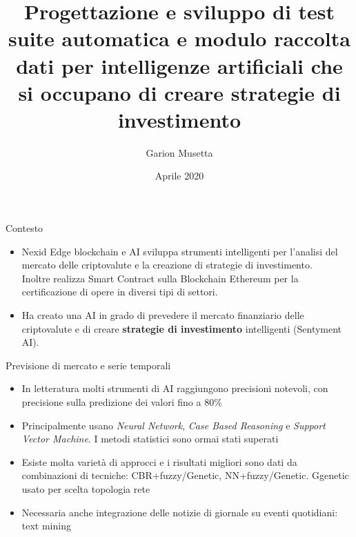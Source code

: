 \documentclass{beamer}
\title[Trading AI]{Progettazione e sviluppo di test suite automatica e modulo raccolta dati per intelligenze artificiali che si occupano di creare strategie di investimento}
\author{Garion Musetta}
\date{Aprile 2020}
\begin{document}
\maketitle

\begin{frame}{Contesto}
\begin{itemize}
\item Nexid Edge blockchain e AI sviluppa strumenti intelligenti per l’analisi del mercato delle criptovalute e
la creazione di strategie di investimento.\\ Inoltre realizza Smart Contract sulla Blockchain Ethereum per la certificazione di opere in diversi tipi di settori.
\item Ha creato una AI in grado di prevedere il mercato finanziario delle criptovalute e di creare \textbf{strategie di investimento} intelligenti (Sentyment AI).
\end{itemize}
\begin{figure}
\end{figure}
\end{frame}

\begin{frame}{Previsione di mercato e serie temporali}
\begin{itemize}
\item In letteratura molti strumenti di AI raggiungono precisioni notevoli, con precisione sulla predizione dei valori fino a 80\%
\item Principalmente usano \textit{Neural Network}, \textit{Case Based Reasoning} e \textit{Support Vector Machine}. I metodi statistici sono ormai stati superati
\item Esiste molta varietà di approcci e i risultati migliori sono dati da combinazioni di tecniche: CBR+fuzzy/Genetic, NN+fuzzy/Genetic. Ggenetic usato per scelta topologia rete
\item Necessaria anche integrazione delle notizie di giornale su eventi quotidiani: text mining
\end{itemize}
\end{frame}
\end{document}

